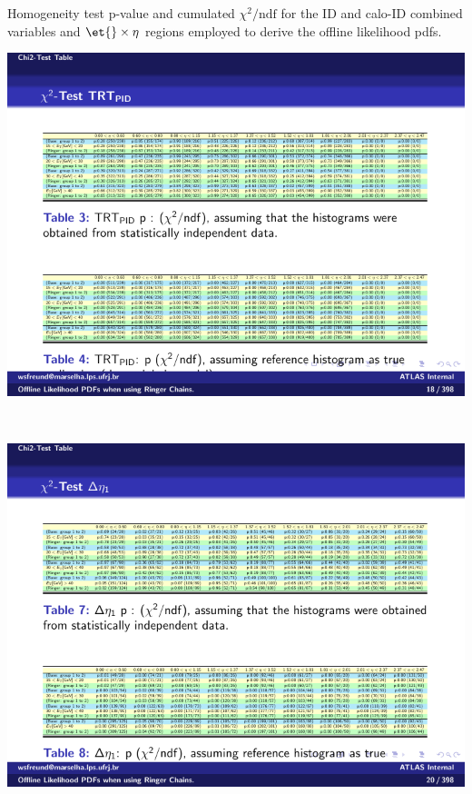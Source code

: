 \begin{table}[b]
\centering
\caption{\label{tab:p_values_homogeneity_track}Homogeneity test p-value and cumulated
  $\chi^2/\text{ndf}$ for the ID and calo-ID combined variables and $\et{}\times\eta{}$
  regions employed to derive the offline likelihood pdfs.}
\begin{subtable}{\textwidth}
\caption{\TRTPID{}\label{tab:p_values_trt}}
\includegraphics[width=\textwidth]{appendices/figures/homogeneity/TRT_PID_homogeneity_table.pdf}
\end{subtable} \\
\begin{subtable}{\textwidth}
\caption{\deltaeta{}\label{tab:p_values_eta}}
\includegraphics[width=\textwidth]{appendices/figures/homogeneity/deltaeta_homogeneity_table.pdf}

\end{subtable}
\end{table}
